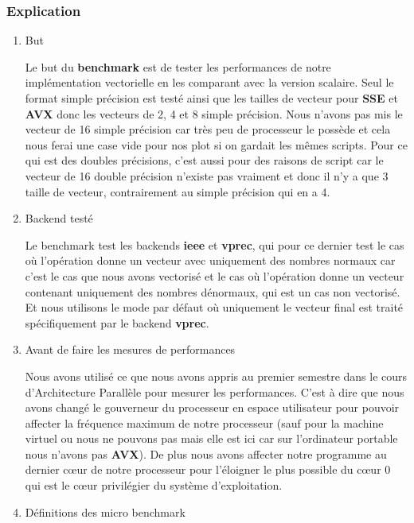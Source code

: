 \documentclass[12pt, letterpaper]{article}
\begin{document}
\subsubsection{Explication}
\label{sec:org74ee8de}
\begin{enumerate}
\item But
\label{sec:orga826b2e}

Le but du \textbf{benchmark} est de tester les performances de notre implémentation
vectorielle en les comparant avec la version scalaire. Seul le format
simple précision est testé ainsi que les tailles de vecteur pour \textbf{SSE} et
\textbf{AVX} donc les vecteurs de 2, 4 et 8 simple précision. Nous n'avons pas mis
le vecteur de 16 simple précision car très peu de processeur le possède et
cela nous ferai une case vide pour nos plot si on gardait les mêmes
scripts. Pour ce qui est des doubles précisions, c'est aussi pour des
raisons de script car le vecteur de 16 double précision n'existe pas
vraiment et donc il n'y a que 3 taille de vecteur, contrairement au simple
précision qui en a 4.

\item Backend testé
\label{sec:org2ae412b}

Le benchmark test les backends \textbf{ieee} et \textbf{vprec}, qui pour ce dernier test
le cas où l'opération donne un vecteur avec uniquement des nombres normaux
car c'est le cas que nous avons vectorisé et le cas où l'opération donne un
vecteur contenant uniquement des nombres dénormaux, qui est un cas non
vectorisé. Et nous utilisons le mode par défaut où uniquement le vecteur
final est traité spécifiquement par le backend \textbf{vprec}.

\item Avant de faire les mesures de performances
\label{sec:org04a18ba}

Nous avons utilisé ce que nous avons appris au premier semestre dans le
cours d'Architecture Parallèle pour mesurer les performances. C'est à dire
que nous avons changé le gouverneur du processeur en espace utilisateur
pour pouvoir affecter la fréquence maximum de notre processeur (sauf pour la
machine virtuel ou nous ne pouvons pas mais elle est ici car sur
l'ordinateur portable nous n'avons pas \textbf{AVX}). De plus nous avons affecter
notre programme au dernier cœur de notre processeur pour l'éloigner le plus
possible du cœur 0 qui est le cœur privilégier du système d'exploitation.

\item Définitions des micro benchmark
\label{sec:orga24640f}


\end{enumerate}
\end{document}
